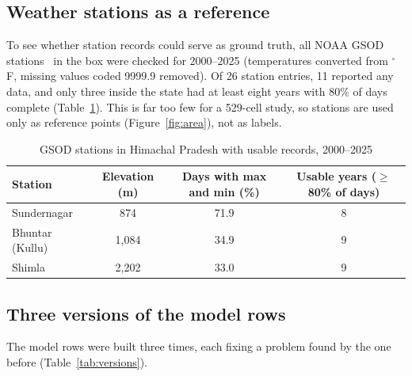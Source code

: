 \documentclass[12pt,a4paper]{report}
\begin{document}
\subsection{Weather stations as a reference}
To see whether station records could serve as ground truth, all NOAA GSOD stations~\cite{gsod} in the box were
checked for 2000--2025 (temperatures converted from $^\circ$F, missing values coded 9999.9 removed). Of 26 station
entries, 11 reported any data, and only three inside the state had at least eight years with 80\% of days complete
(Table~\ref{tab:gsod}). This is far too few for a 529-cell study, so stations are used only as reference points
(Figure~\ref{fig:area}), not as labels.

\begin{table}[H]
\centering
\caption{GSOD stations in Himachal Pradesh with usable records, 2000--2025}
\label{tab:gsod}
\small
\begin{tabular}{|l|c|c|c|}
\hline
\textbf{Station} & \textbf{Elevation (m)} & \textbf{Days with max and min (\%)} & \textbf{Usable years ($\ge$80\% of days)}\\ \hline
Sundernagar & 874 & 71.9 & 8\\ \hline
Bhuntar (Kullu) & 1{,}084 & 34.9 & 9\\ \hline
Shimla & 2{,}202 & 33.0 & 9\\ \hline
\end{tabular}
\end{table}

\subsection{Three versions of the model rows}
The model rows were built three times, each fixing a problem found by the one before (Table~\ref{tab:versions}).
\end{document}
